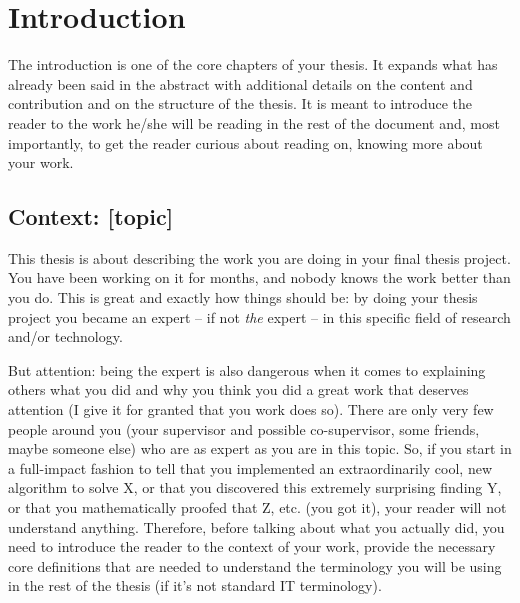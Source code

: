 \chapter{Introduction}
\label{Introduction}
\thispagestyle{empty}


The introduction is one of the core chapters of your thesis. It expands what has already been said in the abstract with additional details on the content and contribution and on the structure of the thesis. It is meant to introduce the reader to the work he/she will be reading in the rest of the document and, most importantly, to get the reader curious about reading on, knowing more about your work.  

\section{Context: [topic]}
This thesis is about describing the work you are doing in your final thesis project. You have been working on it for months, and nobody knows the work better than you do. This is great and exactly how things should be: by doing your thesis project you became an expert -- if not \emph{the} expert -- in this specific field of research and/or technology. 

But attention: being the expert is also dangerous when it comes to explaining others what you did and why you think you did a great work that deserves attention (I give it for granted that you work does so). There are only very few people around you (your supervisor and possible co-supervisor, some friends, maybe someone else) who are as expert as you are in this topic. So, if you start in a full-impact fashion to tell that you implemented an extraordinarily cool, new algorithm to solve X, or that you discovered this extremely surprising finding Y, or that you mathematically proofed that Z, etc. (you got it), your reader will not understand anything. Therefore, before talking about what you actually did, you need to introduce the reader to the context of your work, provide the necessary core definitions that are needed to understand the terminology you will be using in the rest of the thesis (if it's not standard IT terminology).  

